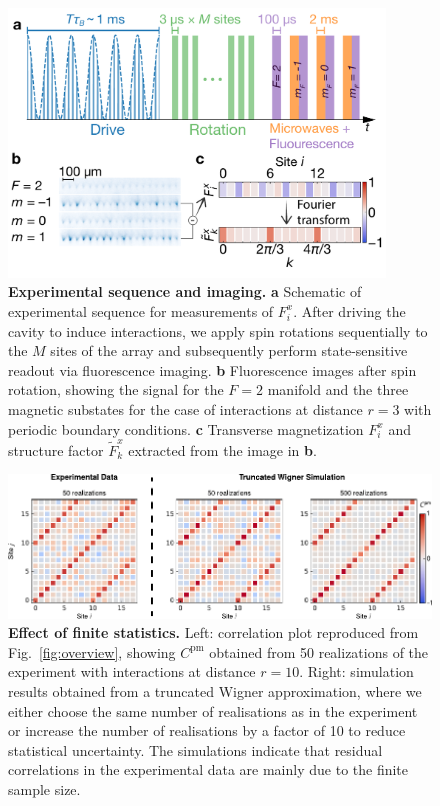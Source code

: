 \documentclass[aps,pra,superscriptaddress,12pt]{revtex4-1} %
\begin{document}
\begin{figure}[htb]
    \includegraphics[width = 100mm]{Figures/ExtData1.pdf}
    \caption{\textbf{Experimental sequence and imaging.} \textbf{a} Schematic of experimental sequence for measurements of $F^x_i$.  After driving the cavity to induce interactions, we apply spin rotations sequentially to the $M$ sites of the array and subsequently perform state-sensitive readout via fluorescence imaging.
    \textbf{b} Fluorescence images after spin rotation, showing the signal for the $F=2$ manifold and the three magnetic substates for the case of interactions at distance $r = 3$ with periodic boundary conditions. \textbf{c} Transverse magnetization $F^x_i$ and structure factor $\tilde{F}^x_k$ extracted from the image in \textbf{b}.}
    \label{fig:sequence}
\end{figure}
\newpage
\begin{figure}[h]
    \centering
    \includegraphics{Figures/ExtData2.pdf}
    \caption{\textbf{Effect of finite statistics.} Left: correlation plot reproduced from Fig.~\ref{fig:overview}, showing $C^\mathrm{pm}$ obtained from 50 realizations of the experiment with interactions at distance $r = 10$. Right: simulation results obtained from a truncated Wigner approximation, where we either choose the same number of realisations as in the experiment or increase the number of realisations by a factor of 10 to reduce statistical uncertainty. The simulations indicate that residual correlations in the experimental data are mainly due to the finite sample size.}
    \label{ExtFig:FiniteStat}
\end{figure}
\end{document}
